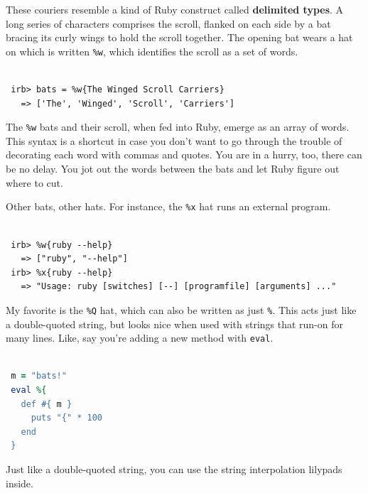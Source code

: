 \documentclass[10pt,twoside]{report}
\begin{document}
These couriers resemble a kind of Ruby construct called {\bf delimited
  types}.  A long series of characters comprises the scroll, flanked
on each side by a bat bracing its curly wings to hold the scroll
together. The opening bat wears a hat on which is written
\lstinline[breaklines=true]|%w|, which identifies the scroll as a set
of words.


\begin{lstlisting}

 irb> bats = %w{The Winged Scroll Carriers}
   => ['The', 'Winged', 'Scroll', 'Carriers']

\end{lstlisting}


The \lstinline[breaklines=true]|%w| bats and their scroll, when fed
into Ruby, emerge as an array of words.  This syntax is a shortcut in
case you don't want to go through the trouble of decorating each word
with commas and quotes.  You are in a hurry, too, there can be no
delay.  You jot out the words between the bats and let Ruby figure out
where to cut.

Other bats, other hats.  For instance, the
\lstinline[breaklines=true]|%x| hat runs an external program.


\begin{lstlisting}

 irb> %w{ruby --help}
   => ["ruby", "--help"]
 irb> %x{ruby --help}
   => "Usage: ruby [switches] [--] [programfile] [arguments] ..."

\end{lstlisting}


My favorite is the \lstinline[breaklines=true]|%Q| hat, which can also
be written as just \lstinline[breaklines=true]|%|.  This acts just
like a double-quoted string, but looks nice when used with strings
that run-on for many lines.  Like, say you're adding a new method with
\lstinline[breaklines=true]|eval|.


\begin{lstlisting}[basicstyle=\ttfamily\color{basiccolor},
    commentstyle = \ttfamily\color{commentcolor},
    keywordstyle=\ttfamily\color{keywordscolor},
    stringstyle=\color{stringcolor},
    language=Ruby,
    basicstyle=\small\ttfamily,
    showstringspaces=false,
  ]

 m = "bats!"
 eval %{
   def #{ m }
     puts "{" * 100
   end
 }

\end{lstlisting}


Just like a double-quoted string, you can use the string interpolation
lilypads inside.
\end{document}
